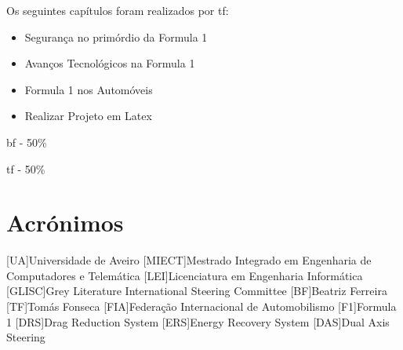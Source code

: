 \documentclass{report}
\begin{document}
Os seguintes capítulos foram realizados por \ac{tf}:
\begin{itemize}
\item Segurança no primórdio da Formula 1
\item Avanços Tecnológicos na Formula 1
\item Formula 1 nos Automóveis
\item Realizar Projeto em Latex\\[0.5cm]
\end{itemize}

\ac{bf} - 50\%


\ac{tf} - 50\%


\chapter*{Acrónimos}
\begin{acronym}
[UA]{Universidade de Aveiro}
[MIECT]{Mestrado Integrado em Engenharia de Computadores e Telemática}
[LEI]{Licenciatura em Engenharia Informática}
[GLISC]{Grey Literature International Steering Committee}
[BF]{Beatriz Ferreira}
[TF]{Tomás Fonseca}
[FIA]{Federação Internacional de Automobilismo}
[F1]{Formula 1}
[DRS]{Drag Reduction System}
[ERS]{Energy Recovery System}
[DAS]{Dual Axis Steering}
\end{acronym}


\printbibliography
\end{document}
